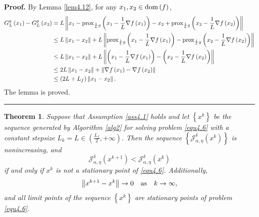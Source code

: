\documentclass[a4paper,12pt]{article}
\newtheorem{theorem}{Theorem}[section]
\numberwithin{equation}{section}
\newenvironment{proof}[1][Proof]{\textbf{#1.} }
{\ \rule{0.75em}{0.75em}\smallskip}
\begin{document}
\begin{proof}
    By Lemma \ref{lem4.12}, for any $x_{1},x_{2}\in {\rm dom}\left(f\right)$,
    \begin{align*}
        G_{L}^{g}\left(x_{1}\right)-G_{L}^{g}\left(x_{2}\right)
        & = L\left\|x_{1}-{\rm prox}_{\frac{1}{L}g}\left(x_{1}-\frac{1}{L}\nabla f\left(x_{1}\right)\right) -x_{2}+{\rm prox}_{\frac{1}{L}g}\left(x_{2}- \frac{1}{L}\nabla f\left(x_{2}\right)\right)\right\| \\
        & \leq L\left\|x_{1}-x_{2}\right\|+L\left\|{\rm prox}_{\frac{1}{L}g}\left(x_{1}- \frac{1}{L}\nabla f\left(x_{1}\right)\right)-{\rm prox}_{\frac{1}{L}g}\left(x_{2}- \frac{1}{L}\nabla f\left(x_{2}\right)\right)\right\| \\
        & \leq L\left\|x_{1}-x_{2}\right\|+L\left\|\left(x_{1}- \frac{1}{L}\nabla f\left(x_{1}\right)\right)-\left(x_{2}-\frac{1}{L}\nabla f\left(x_{2}\right)\right)\right\| \\
        & \leq 2L\left\|x_{1}-x_{2}\right\|+\left\|\nabla f\left(x_{1}\right)-\nabla f\left(x_{2}\right)\right\| \\
        & \leq \left(2L+L_{f}\right)\left\|x_{1}-x_{2}\right\|.
    \end{align*}
    The lemma is proved.
\end{proof}

\begin{theorem}\label{the4.15}
     Suppose that Assumption \ref{ass4.1} holds and let $\left\{x^{k}\right\}$ be the sequence generated by Algorithm \ref{alg2} for solving problem \eqref{equ4.6} with a constant stepsize $L_{k}=L\in\left(\frac{L_{f}}{2},+\infty\right)$. Then the sequence $\left\{\mathcal{J}_{\alpha,\eta}^{\delta}\left(x^{k}\right)\right\}$ is nonincreasing, and
     \begin{equation*}
         \mathcal{J}_{\alpha,\eta}^{\delta}\left(x^{k+1}\right)< \mathcal{J}_{\alpha,\eta}^{\delta}\left(x^{k}\right)
     \end{equation*}
     if and only if $x^{k}$ is not a stationary point of \eqref{equ4.6}. Additionally, 
     \begin{equation*}
         \left\|x^{k+1}-x^{k}\right\|\rightarrow 0\quad {\rm as}\quad k\rightarrow\infty,
     \end{equation*}
     and all limit points of the sequence $\left\{x^{k}\right\}$ are stationary points of problem \eqref{equ4.6}.
\end{theorem}
\end{document}
